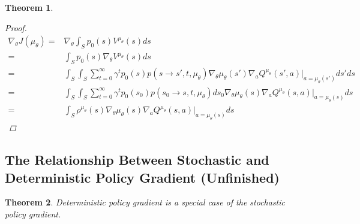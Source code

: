 \documentclass[a4paper]{article}
\newtheorem{theorem}{Theorem}
\begin{document}
\begin{theorem}
\begin{proof}
\begin{align*}
            \nabla_\theta J(\mu_\theta)
            =& \nabla_\theta \int_S p_0(s) V ^{\mu_\theta}(s) ds \\
            =& \int_S p_0(s) \nabla_\theta V ^{\mu_\theta}(s) ds \\
            =& \int_S \int_S \sum^{\infty}_{t=0} \gamma^t p_0(s) p(s \rightarrow s', t, \mu_\theta) \nabla_\theta \mu_\theta(s') \nabla_a Q^{\mu_\theta} (s', a) |_{a=\mu_\theta(s')} ds' ds\\
            =& \int_S \int_S \sum^{\infty}_{t=0} \gamma^t p_0(s_0) p(s_0 \rightarrow s, t, \mu_\theta) ds_0 \nabla_\theta \mu_\theta(s)\nabla_a Q^{\mu_\theta}(s,a)|_{a=\mu_\theta(s)} ds\\
            =& \int_S \rho ^{\mu_\theta}(s) \nabla_\theta \mu_\theta(s) \nabla_a Q^{\mu_\theta}(s, a) |_{a=\mu_\theta(s)} ds
        \end{align*}
    \end{proof}
\end{theorem}

\subsection{The Relationship Between Stochastic and Deterministic Policy Gradient (Unfinished)}%
\label{sub:the_relationship_between_stochastic_and_deterministic_policy_gradient}

\begin{theorem}
    Deterministic policy gradient is a special case of the stochastic policy gradient.
\end{theorem}
\end{document}
